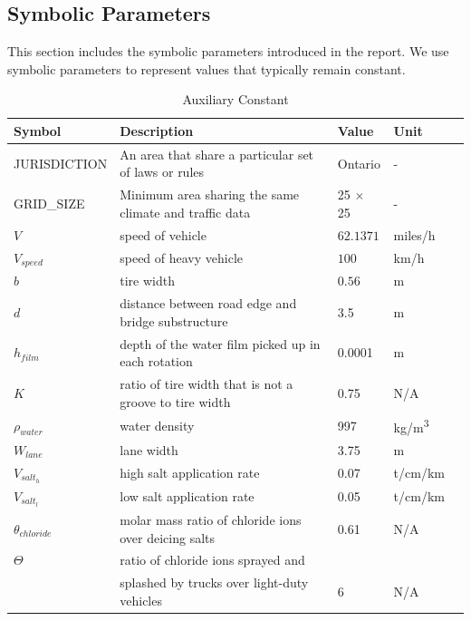 \documentclass[12pt]{article}
\begin{document}
\subsection{Symbolic Parameters}
This section includes the symbolic parameters introduced in the report. We use symbolic parameters to represent values that typically remain constant.

\begin{table}[!h]

  \renewcommand{\arraystretch}{1.2}
\noindent \begin{longtable*}{l l l l c} 
  \toprule
 \textbf{Symbol} & \textbf{Description} & \textbf{Value} & \textbf{Unit}\\


  \midrule 
  JURISDICTION & An area that share a particular set of laws or rules & Ontario & - \\
  GRID\_SIZE & Minimum area sharing the same climate and traffic data & 25 $\times$ 25 & - \\
  $V$ &  speed of vehicle & $62.1371$ & miles/h   \\
  $V_{speed}$ & speed of heavy vehicle & $100$ & km/h   \\
  $b$ & tire width & $0.56$ & m   \\
  $d$ & distance between road edge and bridge substructure & 3.5 & m
  \\
  $h_{film}$ & depth of the water film picked up in each rotation & 0.0001 & m
  \\
  $K$ & ratio of tire width that is not a groove to tire width & 0.75& N/A
  \\
  $\rho_{water}$ & water density & 997 & \si{kg/m^3}
  \\  
  $W_{lane}$ & lane width & 3.75 & m
  \\  
  $V_{salt_{h}}$ & high salt application rate & 0.07 & t/cm/km \\
  $V_{salt_{l}}$ & low salt application rate & 0.05 & t/cm/km
  \\
  $\theta_{chloride}$ &  molar mass ratio of chloride ions over deicing salts & 0.61 & N/A \\
  $\Theta$ & ratio of chloride ions sprayed and  \\
  & splashed by trucks over light-duty vehicles& 6 & N/A  \\  
  
  \bottomrule
\end{longtable*}
  \caption{Auxiliary Constant} \label{TblConstants}
\end{table}
\end{document}
